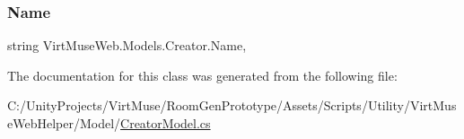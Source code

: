 \mbox{\label{class_virt_muse_web_1_1_models_1_1_creator_a4ebb4ac1c0dede1965066e5dc9c13061}} 
\subsubsection{\texorpdfstring{Name}{Name}}
{\footnotesize\ttfamily string Virt\+Muse\+Web.\+Models.\+Creator.\+Name\hspace{0.3cm}{\ttfamily [get]}, {\ttfamily [set]}}



The documentation for this class was generated from the following file\+:\begin{DoxyCompactItemize}
\item 
C\+:/\+Unity\+Projects/\+Virt\+Muse/\+Room\+Gen\+Prototype/\+Assets/\+Scripts/\+Utility/\+Virt\+Muse\+Web\+Helper/\+Model/\mbox{\hyperlink{_creator_model_8cs}{Creator\+Model.\+cs}}\end{DoxyCompactItemize}
